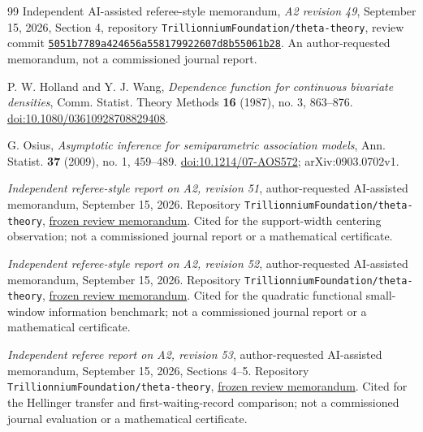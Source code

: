 \begin{thebibliography}{99}
Independent AI-assisted referee-style memorandum,
\emph{A2 revision 49}, September 15, 2026, Section 4,
repository \texttt{Trillionnium\allowbreak Foundation/\allowbreak theta-theory},
review commit
\href{https://github.com/TrillionniumFoundation/theta-theory/commit/5051b7789a424656a558179922607d8b55061b28}{\texttt{5051b778\allowbreak 9a424656\allowbreak a5581799\allowbreak 22607d8b\allowbreak 55061b28}}.
An author-requested memorandum, not a commissioned journal report.


P. W. Holland and Y. J. Wang, \emph{Dependence function for continuous
bivariate densities}, Comm. Statist. Theory Methods \textbf{16} (1987),
no. 3, 863--876. \href{https://doi.org/10.1080/03610928708829408}{doi:10.1080/03610928708829408}.

G. Osius, \emph{Asymptotic inference for semiparametric association models},
Ann. Statist. \textbf{37} (2009), no. 1, 459--489.
\href{https://doi.org/10.1214/07-AOS572}{doi:10.1214/07-AOS572}; arXiv:0903.0702v1.


\emph{Independent referee-style report on A2, revision 51},
author-requested AI-assisted memorandum, September 15, 2026.
Repository \texttt{TrillionniumFoundation/theta-theory},
\href{https://github.com/TrillionniumFoundation/theta-theory/blob/d0fd9a9b0d5cdd8004f42a7f109e39de50adda75/reviews/a2-v51-independent-harsh-top4-2026-09-15/REFEREE_REPORT.md}{frozen review memorandum}.
Cited for the support-width centering observation; not a commissioned
journal report or a mathematical certificate.


\emph{Independent referee-style report on A2, revision 52},
author-requested AI-assisted memorandum, September 15, 2026.
Repository \texttt{TrillionniumFoundation/theta-theory},
\href{https://github.com/TrillionniumFoundation/theta-theory/blob/28873f43ff25b2052afcce4df8c68907517e8b14/reviews/a2-v52-independent-harsh-top4-2026-09-15/REFEREE_REPORT.md}{frozen review memorandum}.
Cited for the quadratic functional small-window information benchmark;
not a commissioned journal report or a mathematical certificate.

\emph{Independent referee report on A2, revision 53},
author-requested AI-assisted memorandum, September 15, 2026, Sections 4--5.
Repository \texttt{TrillionniumFoundation/theta-theory},
\href{https://github.com/TrillionniumFoundation/theta-theory/blob/000ce24f65f8381d2180cbd1f080d3d8470c8157/reviews/a2-v53-independent-harsh-top4-2026-09-15/REFEREE_REPORT.md}{frozen review memorandum}.
Cited for the Hellinger transfer and first-waiting-record comparison;
not a commissioned journal evaluation or a mathematical certificate.

\end{thebibliography}
